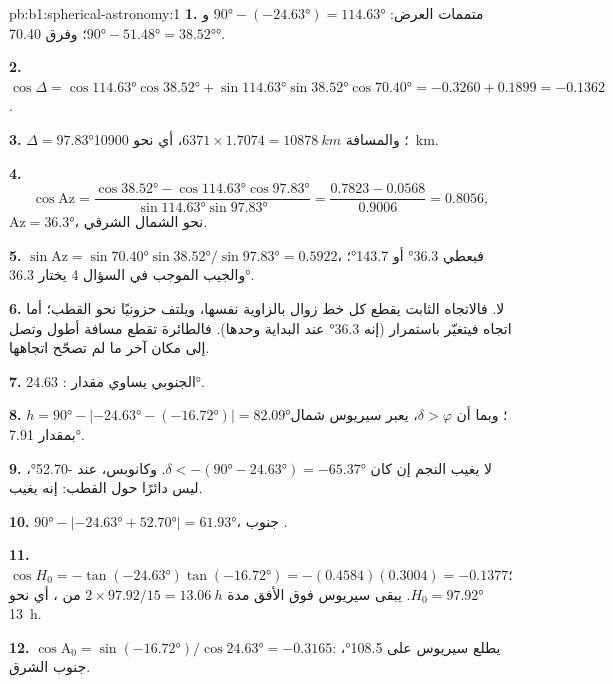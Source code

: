 \begin{solution}{pb:b1:spherical-astronomy:1}
\textbf{1.} متممات العرض: $\ang{90} - (\ang{-24.63}) = \ang{114.63}$ و
$\ang{90} - \ang{51.48} = \ang{38.52}$؛ وفرق  \ang{70.40}.

\textbf{2.} $\cos\Delta = \cos\ang{114.63}\cos\ang{38.52} +
\sin\ang{114.63}\sin\ang{38.52}\cos\ang{70.40} = -0.3260 + 0.1899 =
-0.1362$.

\textbf{3.} $\Delta = \ang{97.83}$؛ والمسافة $6371\times1.7074 =
\qty{10878}{km}$، أي نحو \qty{10900}{km}.

\textbf{4.}
\[
  \cos\mathrm{Az} = \frac{\cos\ang{38.52} - \cos\ang{114.63}\cos\ang{97.83}}
  {\sin\ang{114.63}\sin\ang{97.83}} = \frac{0.7823 - 0.0568}{0.9006} = 0.8056 ,
\]
$\mathrm{Az} = \ang{36.3}$، نحو الشمال الشرقي.

\textbf{5.} $\sin\mathrm{Az} = \sin\ang{70.40}\sin\ang{38.52}/\sin\ang{97.83}
= 0.5922$، فيعطي \ang{36.3} أو \ang{143.7}؛ والجيب الموجب في السؤال 4 يختار \ang{36.3}.

\textbf{6.} لا. فالاتجاه الثابت يقطع كل خط زوال بالزاوية نفسها، ويلتف حزونيًا نحو القطب؛ أما اتجاه  فيتغيّر باستمرار (إنه \ang{36.3} عند البداية وحدها). فالطائرة تقطع مسافة أطول وتصل إلى مكان آخر ما لم تصحّح اتجاهها.

\textbf{7.}  الجنوبي يساوي مقدار : \ang{24.63}.

\textbf{8.} $h = \ang{90} - |\ang{-24.63} - (\ang{-16.72})| = \ang{82.09}$؛
وبما أن $\delta > \varphi$، يعبر سيريوس شمال  بمقدار \ang{7.91}.

\textbf{9.} لا يغيب النجم إن كان $\delta < -(\ang{90} - \ang{24.63}) =
\ang{-65.37}$. وكانوبس، عند \ang{-52.70}، ليس دائرًا حول القطب: إنه يغيب.

\textbf{10.} $\ang{90} - |\ang{-24.63} + \ang{52.70}| = \ang{61.93}$، جنوب
.

\textbf{11.} $\cos H_0 = -\tan(\ang{-24.63})\tan(\ang{-16.72}) =
-(0.4584)(0.3004) = -0.1377$؛ $H_0 = \ang{97.92}$. يبقى سيريوس فوق الأفق مدة
$2\times97.92/15 = \qty{13.06}{h}$ من ، أي نحو \qty{13}{h}.

\textbf{12.} $\cos\mathrm{A}_0 = \sin(\ang{-16.72})/\cos\ang{24.63} =
-0.3165$: يطلع سيريوس على  \ang{108.5}، جنوب الشرق.


\end{solution}
